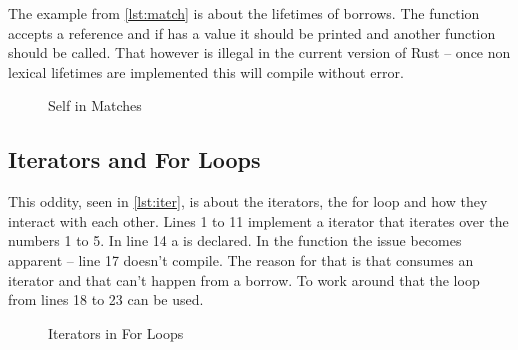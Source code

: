 \documentclass[thesis]{subfiles}
\begin{document}
    The example from \autoref{lst:match} is about the lifetimes of borrows.
    The function \fun accepts a \Foo reference and if  has a value it should be printed and another function should be called.
    That however is illegal in the current version of Rust -- once non lexical lifetimes are implemented this will compile without error.

    \begin{figure}[ht]
      \captionsetup{type=lstlisting}
      
      \caption{Self in Matches}\label{lst:match}
    \end{figure}


  \subsection{Iterators and For Loops}
    This oddity, seen in \autoref{lst:iter}, is about the iterators, the for loop and how they interact with each other.
    Lines 1 to 11 implement a iterator that iterates over the numbers 1 to 5.
    In line 14 a \struct \Foo is declared.
    In the \fun function the issue becomes apparent -- line 17 doesn't compile.
    The reason for that is that \for consumes an iterator and that can't happen from a borrow.
    To work around that the loop from lines 18 to 23 can be used.

    \begin{figure}[ht]
      \captionsetup{type=lstlisting}
      
      \caption{Iterators in For Loops}\label{lst:iter}
    \end{figure}
\end{document}
